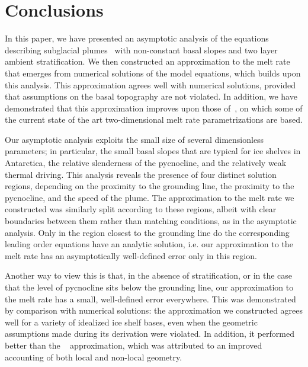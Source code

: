 \documentclass[openacc]{rsproca_new}%
\begin{document}
\section{Conclusions}\label{S:Discussion}
In this paper, we have presented an asymptotic analysis of the equations describing subglacial plumes~\cite{Jenkins1991JGeophysResOceans, Jenkins2011JPhysOcean} with non-constant basal slopes and two layer ambient stratification. We then constructed an approximation to the melt rate that emerges from numerical solutions of the model equations, which builds upon this analysis. This approximation agrees well with numerical solutions, provided that assumptions on the basal topography are not violated. In addition, we have demonstrated that this approximation improves upon those of~\citet{Lazeroms2019JPhysOcean}, on which some of the current state of the art two-dimensional melt rate parametrizations are based.

Our asymptotic analysis exploits the small size of several dimensionless parameters; in particular, the small basal slopes that are typical for ice shelves in Antarctica, the relative slenderness of the pycnocline, and the relatively weak thermal driving. This analysis reveals the presence of four distinct solution regions, depending on the proximity to the grounding line, the proximity to the pycnocline, and the speed of the plume. The approximation to the melt rate we constructed was similarly split according to these regions, albeit with clear boundaries between them rather than matching conditions, as in the asymptotic analysis. Only in the region closest to the grounding line do the corresponding leading order equations have an analytic solution, i.e. our approximation to the melt rate has an asymptotically well-defined error only in this region. 

Another way to view this is that, in the absence of stratification, or in the case that the level of pycnocline sits below the grounding line, our approximation to the melt rate has a small, well-defined error everywhere.  This was demonstrated by comparison with numerical solutions: the approximation we constructed agrees well for a variety of idealized ice shelf bases, even when the geometric assumptions made during its derivation were violated. In addition, it performed better than the ~\citet{Lazeroms2019JPhysOcean} approximation, which was attributed to an improved accounting of both local and non-local geometry.
\end{document}
